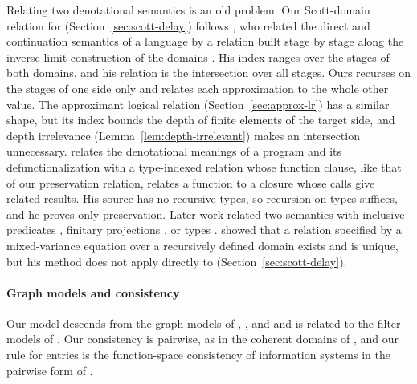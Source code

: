 Relating two denotational semantics is an old problem.  Our
Scott-domain relation for 
(Section~\ref{sec:scott-delay}) follows \citet{Reynolds:1974aa}, who
related the direct and continuation semantics of a language by a
relation built stage by stage along the inverse-limit construction of
the domains \citep{Scott:1971aa}. His index ranges over the stages of
both domains, and his relation is the intersection over all stages.
Ours recurses on the stages of one side only and relates each
approximation to the whole other value. The approximant logical
relation (Section~\ref{sec:approx-lr}) has a similar shape, but its
index bounds the depth of finite elements of the target side, and
depth irrelevance (Lemma~\ref{lem:depth-irrelevant}) makes an
intersection unnecessary. \citet{Nielsen:2000aa} relates the
denotational meanings of a program and its defunctionalization with a
type-indexed relation whose function clause, like that of our
preservation relation, relates a function to a closure whose calls
give related results. His source has no recursive types, so recursion
on types suffices, and he proves only preservation. Later work related
two semantics with inclusive predicates
\citep{Milne:1976aa,Stoy:1977aa}, finitary projections
\citep{Mulmuley:1987aa}, or types
\citep{Meyer:1985aa,Filinski:2007aa}.  \citet{Pitts:1996aa} showed
that a relation specified by a mixed-variance equation over a
recursively defined domain exists and is unique, but his method does
not apply directly to 
(Section~\ref{sec:scott-delay}).


\paragraph{Graph models and consistency}

Our model descends from the graph models of \citet{Scott:1976lq},
\citet{Engeler:1981aa}, and \citet{Plotkin:1993ab} and is related to the
filter models of \citet{Barendregt:1983aa}. Our consistency is
pairwise, as in the coherent domains of \citet{Plotkin:1978aa}, and our
rule for entries is the function-space consistency of information
systems \citep{Scott:1982aa,Larsen:1984aa} in the pairwise form of
\citet{Schwichtenberg:2006aa}.

